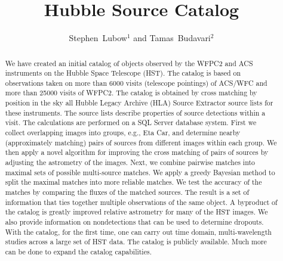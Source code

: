 
\resetcounters




\title{Hubble Source Catalog}
\author{Stephen~Lubow$^1$ and Tamas~Budavari$^2$
}


\begin{abstract}
We have created an initial catalog of objects observed by the WFPC2 and ACS instruments on the Hubble Space Telescope (HST). The catalog is based on observations taken on more than 6000 visits (telescope pointings) of ACS/WFC and more than 25000 visits of WFPC2. The catalog is obtained by cross matching by position in the sky all Hubble Legacy Archive (HLA) Source Extractor source lists for these instruments. The source lists describe properties of source detections within a visit. The calculations are performed on a SQL Server database system. First we collect overlapping images into groups, e.g., Eta Car, and determine nearby (approximately matching) pairs of sources from different images within each group. We then apply a novel algorithm for improving the cross matching of pairs of sources by adjusting the astrometry of the images. Next, we combine pairwise matches into maximal sets of possible multi-source matches. We apply a greedy Bayesian method to split the maximal matches into more reliable matches. We test the accuracy of the matches by comparing the fluxes of the matched sources. The result is a set of information that ties together multiple observations of the same object. A byproduct of the catalog is greatly improved relative astrometry for many of the HST images. We also provide information on nondetections that can be used to determine dropouts. With the catalog, for the first time, one can carry out time domain, multi-wavelength studies across a large set of HST data. The catalog is publicly available. Much more can be done to expand the catalog capabilities.

\end{abstract}

